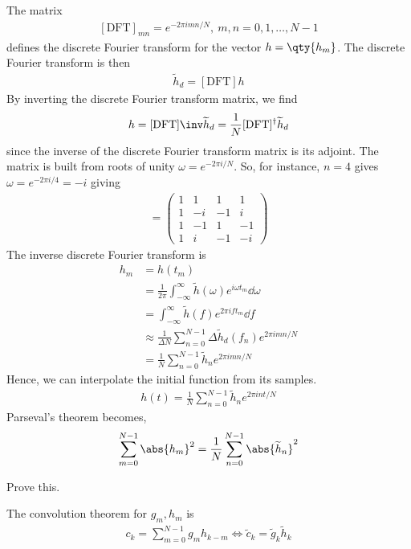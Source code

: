 The matrix
\begin{align} \label{eq:8.48}
	[\mathrm{DFT}]_{mn} = e^{-2\pi i m n / N},\ m, n = 0, 1, \dots, N-1
\end{align} defines the discrete Fourier transform for the vector $h = \qty{h_m}$.
The discrete Fourier transform is then
\begin{align*}
	\widetilde h_d = [\mathrm{DFT}] h
\end{align*}
By inverting the discrete Fourier transform matrix, we find
\begin{align*}
	h = [\mathrm{DFT}]\inv \widetilde h_d = \frac{1}{N} [\mathrm{DFT}]^\dagger \widetilde h_d
\end{align*}
since the inverse of the discrete Fourier transform matrix is its adjoint.
The matrix is built from roots of unity $\omega = e^{-2\pi i/N}$.
So, for instance, $n = 4$ gives $\omega = e^{-2\pi i/4} = -i$ giving
\begin{align*}
	[\mathrm{DFT}] = \begin{pmatrix}
		1 & 1  & 1  & 1  \\
		1 & -i & -1 & i  \\
		1 & -1 & 1  & -1 \\
		1 & i  & -1 & -i
	\end{pmatrix}
\end{align*}
The inverse discrete Fourier transform is
\begin{align*}
	h_m &= h(t_m) \\
	    &= \frac{1}{2\pi} \int_{-\infty}^\infty \widetilde h(\omega) e^{i \omega t_m} \dd{\omega} \\
	    &= \int_{-\infty}^\infty \widetilde h(f) e^{2\pi i f t_m} \dd{f} \\
	    &\approx \frac{1}{\Delta N} \sum_{n=0}^{N-1} \Delta \widetilde h_d(f_n) e^{2\pi i m n / N} \\
	    &= \frac{1}{N} \sum_{n=0}^{N-1} \widetilde h_n e^{2\pi i m n / N}
\end{align*}
Hence, we can interpolate the initial function from its samples.
\begin{align*}
	h(t) = \frac{1}{N} \sum_{n=0}^{N-1} \widetilde h_n e^{2\pi i n t / N}
\end{align*}
Parseval's theorem becomes,
\begin{align} \label{eq:8.49}
	\sum_{m=0}^{N-1} \abs{h_m}^2 = \frac{1}{N} \sum_{n=0}^{N-1} \abs{\widetilde h_n}^2
\end{align}
\begin{exercise}
	Prove this.
\end{exercise}
The convolution theorem for $g_m, h_m$ is
\begin{align} \label{eq:8.50}
	c_k = \sum_{m=0}^{N-1} g_m h_{k-m} \iff \widetilde c_k = \widetilde g_k \widetilde h_k
\end{align}

